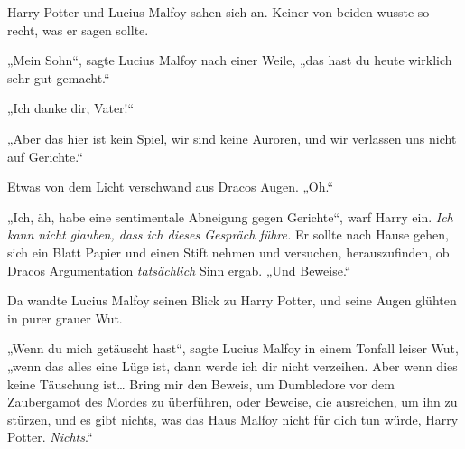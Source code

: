 
Harry Potter und Lucius Malfoy sahen sich an. Keiner von beiden wusste so recht, was er sagen sollte.

„Mein Sohn“, sagte Lucius Malfoy nach einer Weile, „das hast du heute wirklich sehr gut gemacht.“

„Ich danke dir, Vater!“

„Aber das hier ist kein Spiel, wir sind keine Auroren, und wir verlassen uns nicht auf Gerichte.“

Etwas von dem Licht verschwand aus Dracos Augen. „Oh.“

„Ich, äh, habe eine sentimentale Abneigung gegen Gerichte“, warf Harry ein.
\emph{Ich kann nicht glauben, dass ich dieses Gespräch führe.} Er sollte nach Hause gehen, sich ein Blatt Papier und einen Stift nehmen und versuchen, herauszufinden, ob Dracos Argumentation \emph{tatsächlich} Sinn ergab. „Und Beweise.“

Da wandte Lucius Malfoy seinen Blick zu Harry Potter, und seine Augen glühten in purer grauer Wut.

„Wenn du mich getäuscht hast“, sagte Lucius Malfoy in einem Tonfall leiser Wut, „wenn das alles eine Lüge ist, dann werde ich dir nicht verzeihen. Aber wenn dies keine Täuschung ist… Bring mir den Beweis, um Dumbledore vor dem Zaubergamot des Mordes zu überführen, oder Beweise, die ausreichen, um ihn zu stürzen, und es gibt nichts, was das Haus Malfoy nicht für dich tun würde, Harry Potter. \emph{Nichts}.“

